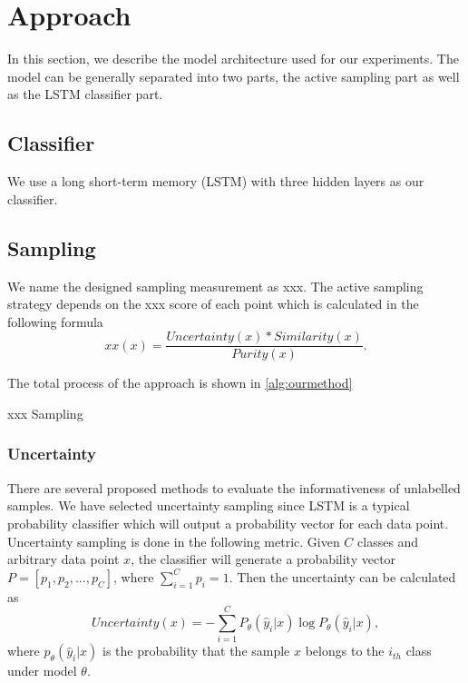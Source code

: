 \section{Approach}
\label{sec:approach}

In this section, we describe the model architecture used for our experiments. 
The model can be generally separated into two parts, the active sampling part as well as the LSTM classifier part. 

\subsection{Classifier}
We use a long short-term memory (LSTM) with three hidden layers 
as our classifier.

\subsection{Sampling}
We name the designed sampling measurement as xxx. The active sampling strategy depends on the xxx score of each point which is calculated in the following formula
$$xx(x) = \frac{Uncertainty(x) * Similarity(x)}{Purity(x)}.$$

The total process of the approach is shown in \ref{alg:ourmethod}
\begin{algorithm}
\small
\caption{xxx Sampling}
\label{alg:ourmethod}
\begin{algorithmic}[1]
\ENDFOR
{}
\ENDWHILE
\end{algorithmic}
\end{algorithm}

\subsubsection*{Uncertainty}
There are several proposed methods to evaluate the informativeness of unlabelled samples. We have selected uncertainty sampling \cite{lewis1994sequential} since LSTM is a typical probability classifier which will output a probability vector for each data point. Uncertainty sampling is done in the following metric. Given $C$ classes and arbitrary data point $x$, the classifier will generate a probability vector $P = [p_1,p_2,...,p_C]$, where $\sum_{i=1}^C p_i = 1$. Then the uncertainty can be calculated as 
$$Uncertainty(x) = - \sum_{i=1}^{C}P_{\theta}(\hat{y}_i|x)\log{P_{\theta}(\hat{y}_i|x)},$$
where $p_{\theta}(\hat{y}_i|x)$ is the probability that the sample $x$ belongs to the $i_{th}$ class under model $\theta$.
